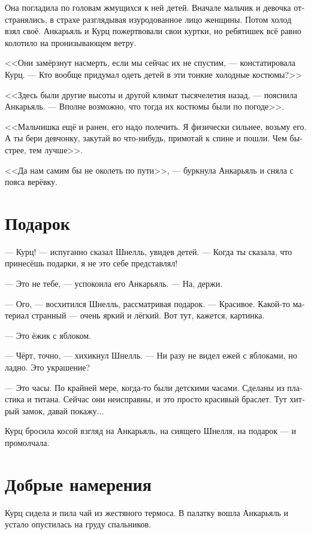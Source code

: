 \documentclass[a4paper,10pt,fleqn]{book}\usepackage{polyglossia}\setdefaultlanguage[babelshorthands=true]{russian}\setotherlanguage{english}\defaultfontfeatures{Ligatures=TeX,Mapping=tex-text}\usepackage{xcolor}\newcommand{\ml}[3]{#2}
\begin{document}
Она погладила по головам жмущихся к ней детей.
Вначале мальчик и девочка отстранялись, в страхе разглядывая изуродованное лицо женщины.
Потом холод взял своё.
Анкарьяль и Курц пожертвовали свои куртки, но ребятишек всё равно колотило на пронизывающем ветру.

<<Они замёрзнут насмерть, если мы сейчас их не спустим, --- констатировала Курц.
--- Кто вообще придумал одеть детей в эти тонкие холодные костюмы?>>

<<Здесь были другие высоты и другой климат тысячелетия назад, --- пояснила Анкарьяль.
--- Вполне возможно, что тогда их костюмы были по погоде>>.

<<Мальчишка ещё и ранен, его надо полечить.
Я физически сильнее, возьму его.
А ты бери девчонку, закутай во что-нибудь, примотай к спине и пошли.
Чем быстрее, тем лучше>>.

<<Да нам самим бы не околеть по пути>>, --- буркнула Анкарьяль и сняла с пояса верёвку.

\section{Подарок}

--- Курц! --- испуганно сказал Шнелль, увидев детей.
--- Когда ты сказала, что принесёшь подарки, я не это себе представлял!

--- Это не тебе, --- успокоила его Анкарьяль.
--- На, держи.

--- Ого, --- восхитился Шнелль, рассматривая подарок.
--- Красивое.
Какой-то материал странный --- очень яркий и лёгкий.
Вот тут, кажется, картинка.

--- Это ёжик с яблоком.

--- Чёрт, точно, --- хихикнул Шнелль.
--- Ни разу не видел ежей с яблоками, но ладно.
Это украшение?

--- Это часы.
По крайней мере, когда-то были детскими часами.
Сделаны из пластика и титана.
Сейчас они неисправны, и это просто красивый браслет.
Тут хитрый замок, давай покажу...

Курц бросила косой взгляд на Анкарьяль, на сиящего Шнелля, на подарок --- и промолчала.

\section{Добрые намерения}

Курц сидела и пила чай из жестяного термоса.
В палатку вошла Анкарьяль и устало опустилась на груду спальников.
\end{document}
